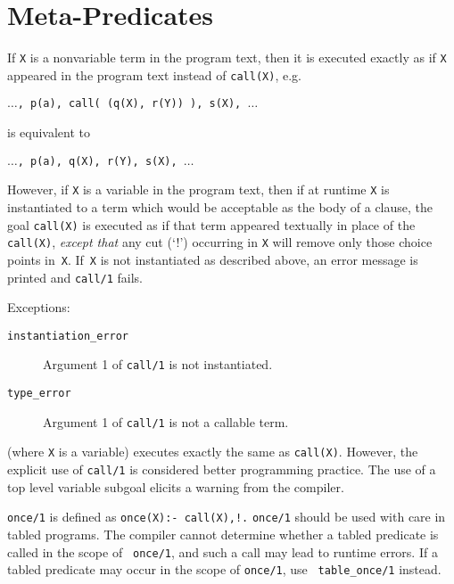 \section{Meta-Predicates} \label{meta_predicates}
\begin{description}
    If {\tt X} is a nonvariable term in the program text, then it is 
    executed exactly as if {\tt X} appeared in the program text instead 
    of {\tt call(X)},
    e.g.
    \begin{center}
        {\tt $\ldots$, p(a), call( (q(X), r(Y)) ), s(X), $\ldots$}
    \end{center}
    is equivalent to
    \begin{center}
        {\tt $\ldots$, p(a), q(X), r(Y), s(X), $\ldots$}
    \end{center}
    However, if {\tt X} is a variable in the program text,
    then if at runtime {\tt X} is instantiated to a term which 
    would be acceptable as the body of a clause, the goal 
    {\tt call(X)} is executed as if that
    term appeared textually in place of the {\tt call(X)},
    {\em except that} any cut (`!')
    occurring in {\tt X} will remove only those choice points in~{\tt X}.
    If~{\tt X} is not instantiated as described above,
    an error message is printed and {\tt call/1} fails.

    Exceptions:
    \begin{description}
    \item[{\tt instantiation\_error}]
	Argument 1 of {\tt call/1} is not instantiated.
     \item[{\tt type\_error}]
	Argument 1 of {\tt call/1} is not a callable term.
    \end{description}

    (where {\tt X} is a variable) executes exactly the same as 
    {\tt call(X)}.
    However, the explicit use of {\tt call/1} is considered better
    programming practice.  The use of a top level variable subgoal
    elicits a warning from the compiler.


{\tt once/1} is defined as {\tt once(X):- call(X),!.}  {\tt once/1}
should be used with care in tabled programs.  The compiler cannot
determine whether a tabled predicate is called in the scope of {\tt
once/1}, and such a call may lead to runtime errors.  If a tabled
predicate may occur in the scope of {\tt once/1}, use {\tt
table\_once/1} instead.


\end{description}
